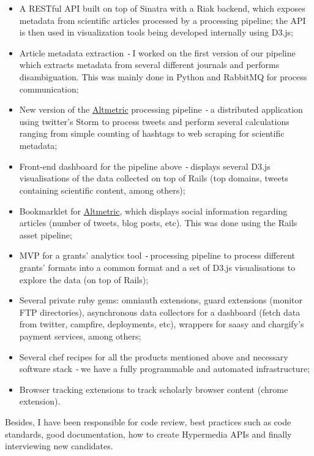 \documentclass{res}
\def\Minus{\texttt{-}\,}
\begin{document}
\begin{resume}
\begin{itemize}
\begin{itemize}
        \item A RESTful API built on top of Sinatra with a Riak backend, which exposes metadata from scientific articles processed by a processing pipeline; the API is then used in visualization tools being developed internally using D3.js;
        \item Article metadata extraction \Minus I worked on the first version of our pipeline which extracts metadata from several different journals and performs disambiguation. This was mainly done in Python and RabbitMQ for process communication;
        \item New version of the \href{http://altmetric.com}{Altmetric} processing pipeline \Minus a distributed application using twitter’s Storm to process tweets and perform several calculations ranging from simple counting of hashtags to web scraping for scientific metadata;
        \item Front-end dashboard for the pipeline above \Minus displays several D3.js visualisations of the data collected on top of Rails (top domains, tweets containing scientific content, among others);
        \item Bookmarklet for \href{http://www.altmetric.com/bookmarklet.php}{Altmetric}, which displays social information regarding articles (number of tweets, blog posts, etc). This was done using the Rails asset pipeline;
        \item MVP for a grants’ analytics tool \Minus processing pipeline to process different grants’ formats into a common format and a set of D3.js visualisations to explore the data (on top of Rails);
        \item Several private ruby gems: omniauth extensions, guard extensions (monitor FTP directories), asynchronous data collectors for a dashboard (fetch data from twitter, campfire, deployments, etc), wrappers for saasy and chargify’s payment services, among others;
        \item Several chef recipes for all the products mentioned above and necessary software stack \Minus we have a fully programmable and automated infrastructure;
        \item Browser tracking extensions to track scholarly browser content (chrome extension).
        \end{itemize}
      Besides, I have been responsible for code review, best practices such as code standards, good documentation, how to create Hypermedia APIs and finally interviewing new candidates.


\end{itemize}
\end{resume}
\end{document}
